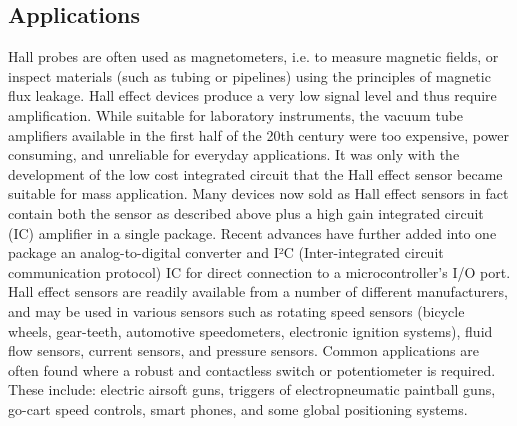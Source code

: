 \subsection{Applications}
Hall probes are often used as magnetometers, i.e. to measure magnetic fields, or inspect materials (such as tubing or pipelines) using the principles of magnetic flux leakage.
Hall effect devices produce a very low signal level and thus require amplification. While suitable for laboratory instruments, the vacuum tube amplifiers available in the first half of the 20th century were too expensive, power consuming, and unreliable for everyday applications. It was only with the development of the low cost integrated circuit that the Hall effect sensor became suitable for mass application. Many devices now sold as Hall effect sensors in fact contain both the sensor as described above plus a high gain integrated circuit (IC) amplifier in a single package. Recent advances have further added into one package an analog-to-digital converter and I²C (Inter-integrated circuit communication protocol) IC for direct connection to a microcontroller's I/O port.
Hall effect sensors are readily available from a number of different manufacturers, and may be used in various sensors such as rotating speed sensors (bicycle wheels, gear-teeth, automotive speedometers, electronic ignition systems), fluid flow sensors, current sensors, and pressure sensors. Common applications are often found where a robust and contactless switch or potentiometer is required. These include: electric airsoft guns, triggers of electropneumatic paintball guns, go-cart speed controls, smart phones, and some global positioning systems. \cite{weblink2}
